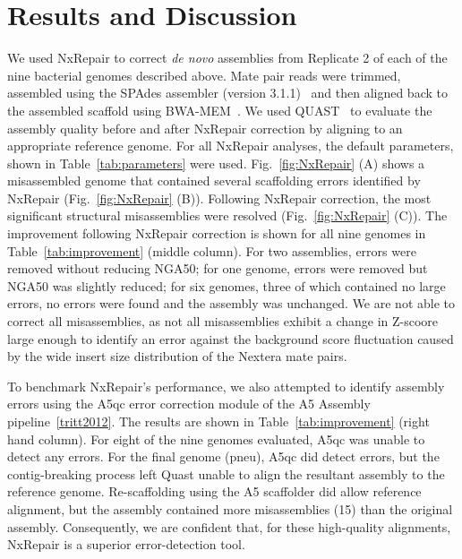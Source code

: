 \documentclass[fleqn,10pt]{wlpeerj}
\begin{document}
\section*{Results and Discussion}
We used NxRepair to correct \textit{de novo} assemblies from Replicate 2 of each of the nine bacterial genomes described above. Mate pair reads were trimmed, assembled using the SPAdes assembler (version 3.1.1)~\citep{Bankevich2012} and then aligned back to the assembled scaffold using BWA-MEM~\citep{li2013}. We used QUAST~\citep{gurevich2013} to evaluate the assembly quality before and after NxRepair correction by aligning to an appropriate reference genome. For all NxRepair analyses, the default parameters, shown in Table~\ref{tab:parameters} were used. Fig.~\ref{fig:NxRepair} (A) shows a misassembled genome that contained several scaffolding errors identified by NxRepair (Fig.~\ref{fig:NxRepair} (B)). Following NxRepair correction, the most significant structural misassemblies were resolved (Fig.~\ref{fig:NxRepair} (C)). The improvement following NxRepair correction is shown for all nine genomes in Table~\ref{tab:improvement} (middle column). For two assemblies, errors were removed without reducing NGA50; for one genome, errors were removed but NGA50 was slightly reduced; for six genomes, three of which contained no large errors, no errors were found and the assembly was unchanged. We are not able to correct all misassemblies, as not all misassemblies exhibit a change in Z-scoore large enough to identify an error against the background score fluctuation caused by the wide insert size distribution of the Nextera mate pairs. 

To benchmark NxRepair's performance, we also attempted to identify assembly errors using the A5qc error correction module of the A5 Assembly pipeline~\ref{tritt2012}. The results are shown in Table~\ref{tab:improvement} (right hand column). For eight of the nine genomes evaluated, A5qc was unable to detect any errors. For the final genome (pneu), A5qc did detect errors, but the contig-breaking process left Quast unable to align the resultant assembly to the reference genome. Re-scaffolding using the A5 scaffolder did allow reference alignment, but the assembly contained more misassemblies (15) than the original assembly. Consequently, we are confident that, for these high-quality alignments, NxRepair is a superior error-detection tool. 
\end{document}
